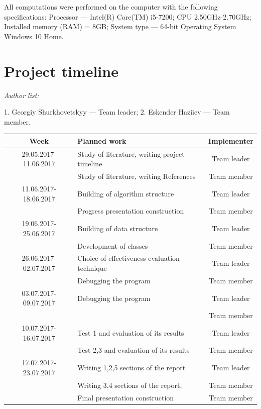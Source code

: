 \documentclass{scrartcl}
\begin{document}
All computations were performed on the computer with the following specifications:
Processor --- Intel(R) Core(TM) i5-7200; CPU 2.50GHz-2.70GHz;
Installed memory (RAM) = 8GB; System type --- 64-bit Operating System Windows 10 Home.

\section{Project timeline}

\emph{Author list:}

1. Georgiy Shurkhovetskyy --- Team leader; 2. Eskender Haziiev --- Team  member.


\vspace{3t}

\begin{tabular}{|c|l|c|} %
  \hline
Week & Planned work                     & Implementer \\
\hline
29.05.2017-11.06.2017 & Study of literature, writing project timeline    &  Team leader\\
& Study of literature, writing References &  Team member \\
\hline
11.06.2017-18.06.2017 & Building of algorithm structure & Team leader\\
& Progress presentation construction & Team member\\
\hline
19.06.2017-25.06.2017 & Building of data structure     &   Team leader\\
& Development of classes   & Team member \\
\hline
26.06.2017-02.07.2017 & Choice of effectiveness evaluation technique       &  Team leader\\
& Debugging the program   &   Team member \\
\hline
03.07.2017-09.07.2017 & Debugging the program     &   Team leader\\
&    & Team member\\
\hline
10.07.2017-16.07.2017 & Test 1 and evaluation of its results & Team leader   \\
& Test 2,3 and evaluation of its results & Team member  \\
\hline
17.07.2017-23.07.2017 & Writing 1,2,5 sections of the report  & Team leader \\
& Writing 3,4 sections of the report,  & Team member  \\
& Final presentation construction & Team member\\
\hline
\end{tabular}


\end{document}
